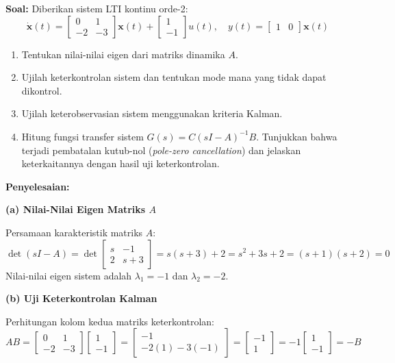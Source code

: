 \documentclass[11pt,a4paper]{article}
\begin{document}
\textbf{Soal:}  
Diberikan sistem LTI kontinu orde-2:
$$\dot{\mathbf{x}}(t) = \begin{bmatrix} 0 & 1 \\ -2 & -3 \end{bmatrix} \mathbf{x}(t) + \begin{bmatrix} 1 \\ -1 \end{bmatrix} u(t), \quad y(t) = \begin{bmatrix} 1 & 0 \end{bmatrix} \mathbf{x}(t)$$
\begin{enumerate}[label=(\alph*)]
    \item Tentukan nilai-nilai eigen dari matriks dinamika $A$.
    \item Ujilah keterkontrolan sistem dan tentukan mode mana yang tidak dapat dikontrol.
    \item Ujilah keterobservasian sistem menggunakan kriteria Kalman.
    \item Hitung fungsi transfer sistem $G(s) = C(sI - A)^{-1} B$. Tunjukkan bahwa terjadi pembatalan kutub-nol (\textit{pole-zero cancellation}) dan jelaskan keterkaitannya dengan hasil uji keterkontrolan.
\end{enumerate}

\textbf{Penyelesaian:}

\textbf{(a) Nilai-Nilai Eigen Matriks $A$}

Persamaan karakteristik matriks $A$:
$$\det(sI - A) = \det\begin{bmatrix} s & -1 \\ 2 & s + 3 \end{bmatrix} = s(s + 3) + 2 = s^2 + 3s + 2 = (s + 1)(s + 2) = 0$$
Nilai-nilai eigen sistem adalah $\lambda_1 = -1$ dan $\lambda_2 = -2$.

\textbf{(b) Uji Keterkontrolan Kalman}

Perhitungan kolom kedua matriks keterkontrolan:
$$AB = \begin{bmatrix} 0 & 1 \\ -2 & -3 \end{bmatrix} \begin{bmatrix} 1 \\ -1 \end{bmatrix} = \begin{bmatrix} -1 \\ -2(1) - 3(-1) \end{bmatrix} = \begin{bmatrix} -1 \\ 1 \end{bmatrix} = -1 \begin{bmatrix} 1 \\ -1 \end{bmatrix} = -B$$
\end{document}
